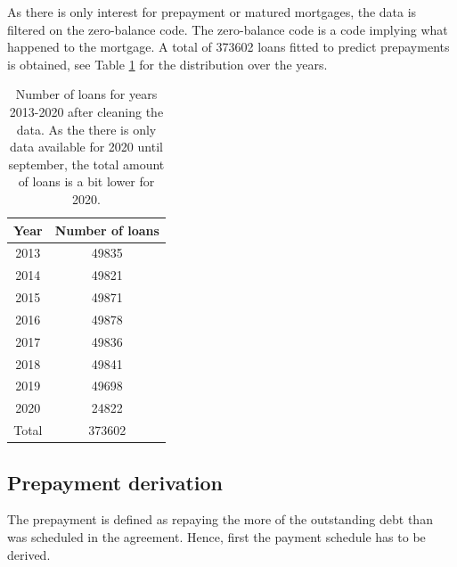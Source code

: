     As there is only interest for 
    prepayment or matured mortgages, the data is filtered on the 
    zero-balance code. The zero-balance code is a code implying what 
    happened to the mortgage. A total of 373602 loans fitted to 
    predict prepayments is obtained, see Table 
    \ref{model_cleaned data_table} for the distribution over the 
    years. 
    \begin{table}[H]
        \centering
        \begin{tabular}{c|c}
            Year & Number of loans \\\hline
            2013 & 49835 \\
            2014 & 49821 \\
            2015 & 49871 \\
            2016 & 49878 \\
            2017 & 49836 \\
            2018 & 49841 \\
            2019 & 49698 \\
            2020 & 24822 \\\hline
            Total & 373602 
		\end{tabular}
		\caption{
            Number of loans for years 2013-2020 after 
            cleaning the data. As the there is only 
            data available for 2020 until september, 
            the total amount of loans is a bit lower for 
            2020. 
            }
		\label{model_cleaned data_table}
    \end{table}
    
\subsection{Prepayment derivation}
    The prepayment is defined as repaying the more of the outstanding debt 
    than was scheduled in the agreement. 
    Hence, first the payment schedule has to be derived. 
    
